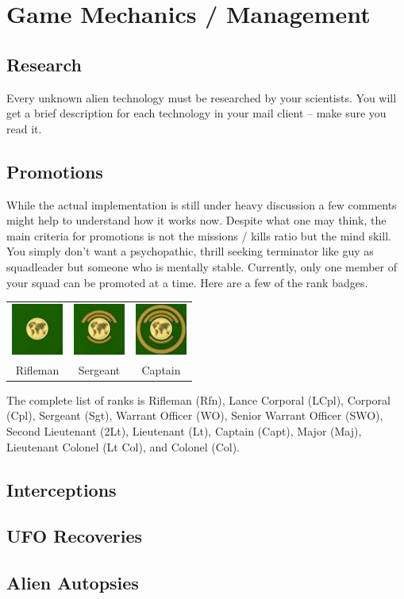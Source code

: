 \section{Game Mechanics / Management}
\subsection{Research}
Every unknown alien technology must be researched by your scientists. You will get a brief description for each technology in your mail client -- make sure you read it.

\subsection{Promotions}
While the actual implementation is still under heavy discussion a few comments might help to understand how it works now. Despite what one may think, the main criteria for promotions is not the missions / kills ratio but the mind skill. You simply don't want a psychopathic, thrill seeking terminator like guy as squadleader but someone who is mentally stable. Currently, only one member of your squad can be promoted at a time.  Here are a few of the rank badges.

\begin{tabular}{ccc}
\includegraphics[scale=1]{images/badges_rekrut_final.jpg} & \includegraphics[scale=1]{images/badges_sergeant_final.jpg} & \includegraphics[scale=1]{images/badges_hauptmann_final.jpg}\\
Rifleman & Sergeant & Captain\\
\end{tabular} 

The complete list of ranks is Rifleman (Rfn), Lance Corporal (LCpl), Corporal (Cpl), Sergeant (Sgt), Warrant Officer (WO), Senior Warrant Officer (SWO), Second Lieutenant (2Lt), Lieutenant (Lt), Captain (Capt), Major (Maj), Lieutenant Colonel (Lt Col), and Colonel (Col).

\subsection{Interceptions}

\subsection{UFO Recoveries}

\subsection{Alien Autopsies}


